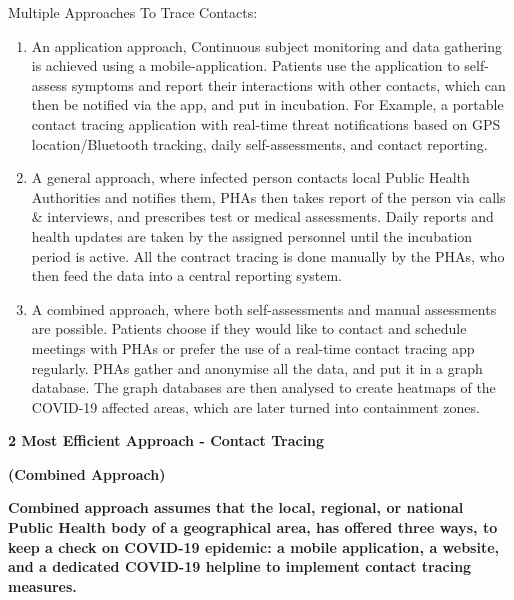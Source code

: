 \documentclass[
]{article}
\begin{document}
Multiple Approaches To Trace Contacts:

\begin{enumerate}
\def\labelenumi{\arabic{enumi}.}
\item
  An application approach, Continuous subject monitoring and data
  gathering is achieved using a mobile-application. Patients use the
  application to self-assess symptoms and report their interactions with
  other contacts, which can then be notified via the app, and put in
  incubation. For Example, a portable contact tracing application with
  real-time threat notifications based on GPS location/Bluetooth
  tracking, daily self-assessments, and contact reporting.
\item
  A general approach, where infected person contacts local Public Health
  Authorities and notifies them, PHAs then takes report of the person
  via calls \& interviews, and prescribes test or medical assessments.
  Daily reports and health updates are taken by the assigned personnel
  until the incubation period is active. All the contract tracing is
  done manually by the PHAs, who then feed the data into a central
  reporting system.
\item
  A combined approach, where both self-assessments and manual
  assessments are possible. Patients choose if they would like to
  contact and schedule meetings with PHAs or prefer the use of a
  real-time contact tracing app regularly. PHAs gather and anonymise all
  the data, and put it in a graph database. The graph databases are then
  analysed to create heatmaps of the COVID-19 affected areas, which are
  later turned into containment zones.
\end{enumerate}

\textbf{2 Most Efficient Approach - Contact Tracing}

\textbf{(Combined Approach)}

\textbf{Combined approach assumes that the local, regional, or national
Public Health body of a geographical area, has offered three ways, to
keep a check on COVID-19 epidemic: a mobile application, a website, and
a dedicated COVID-19 helpline to implement contact tracing measures.}
\end{document}
